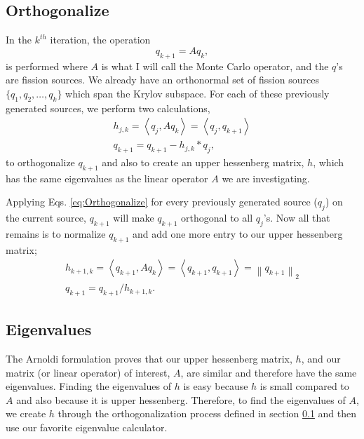 \documentclass[12pt]{article}
\begin{document}
\subsection{Orthogonalize} \label{sec:Orthogonalize}
In the $k^{th}$ iteration, the operation 
\begin{equation}
    q_{k+1} = Aq_k,
\end{equation}
is performed where $A$ is what I will call the Monte Carlo operator, and the $q$'s are fission sources.  We already have an orthonormal set of fission sources $\{q_1, q_2, \dots, q_k\}$ which span the Krylov subspace.  For each of these previously generated sources, we perform two calculations,
\begin{subequations} \label{eq:Orthogonalize}
\begin{gather} 
    h_{j,k} = \left<q_j, Aq_k\right> = \left<q_j,q_{k+1}\right> \\ 
    q_{k+1} = q_{k+1} - h_{j,k}*q_j,
\end{gather}
\end{subequations}
to orthogonalize $q_{k+1}$ and also to create an upper hessenberg matrix, $h$, which has the same eigenvalues as the linear operator $A$ we are investigating.

Applying Eqs. \ref{eq:Orthogonalize} for every previously generated source ($q_j$) on the current source, $q_{k+1}$ will make $q_{k+1}$ orthogonal to all $q_j$'s.  Now all that remains is to normalize $q_{k+1}$ and add one more entry to our upper hessenberg matrix;
\begin{subequations}\begin{gather}
    h_{k+1,k} = \left<q_{k+1},Aq_{k}\right> = \left<q_{k+1},q_{k+1}\right> = \left\|q_{k+1}\right\|_2 \\
    q_{k+1} = q_{k+1}/h_{k+1,k}.
\end{gather}\end{subequations}

\subsection{Eigenvalues}
The Arnoldi formulation proves that our upper hessenberg matrix, $h$, and our matrix (or linear operator) of interest, $A$, are similar and therefore have the same eigenvalues.  Finding the eigenvalues of $h$ is easy because $h$ is small compared to $A$ and also because it is upper hessenberg.  Therefore, to find the eigenvalues of $A$, we create $h$ through the orthogonalization process defined in section \ref{sec:Orthogonalize} and then use our favorite eigenvalue calculator.
\end{document}

